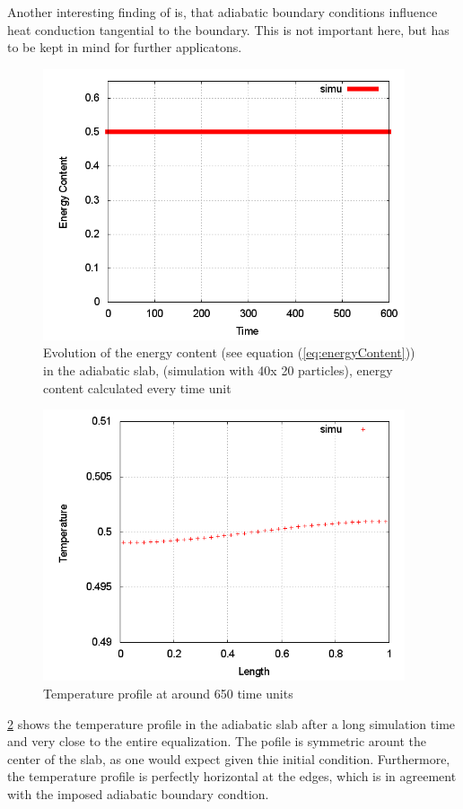\documentclass{report}
\begin{document}
Another interesting finding of \cite{Cleary1999} is, that adiabatic boundary conditions influence heat conduction tangential to the boundary. This is not important here, but has to be kept in mind for further applicatons.




\begin{figure}[h]  
  \label{fig:PureHeat_EnergyEvolution}
  \centering
  \includegraphics[width=0.95\textwidth]{Graphics/results/PureHeatConduction/EnergyContentEvolution}
  \caption{Evolution of the energy content (see equation (\ref{eq:energyContent})) in the adiabatic slab, (simulation with 40x 20 particles), energy content calculated every time unit}
\end{figure}

\begin{figure}[h]  
  \label{fig:PureHeat_TProfile}
  \centering
  \includegraphics[width=0.95\textwidth]{Graphics/results/PureHeatConduction/T_profile000650062499}
  \caption{Temperature profile at around 650 time units}
\end{figure}
\ref{fig:PureHeat_TProfile} shows the temperature profile in the adiabatic slab 
after a long simulation time and very close to the entire equalization. The pofile is symmetric arount the center of the slab, as one would expect given thie initial condition. Furthermore, the temperature profile is perfectly horizontal at the edges, which is in agreement with the imposed adiabatic boundary condtion.
\end{document}
